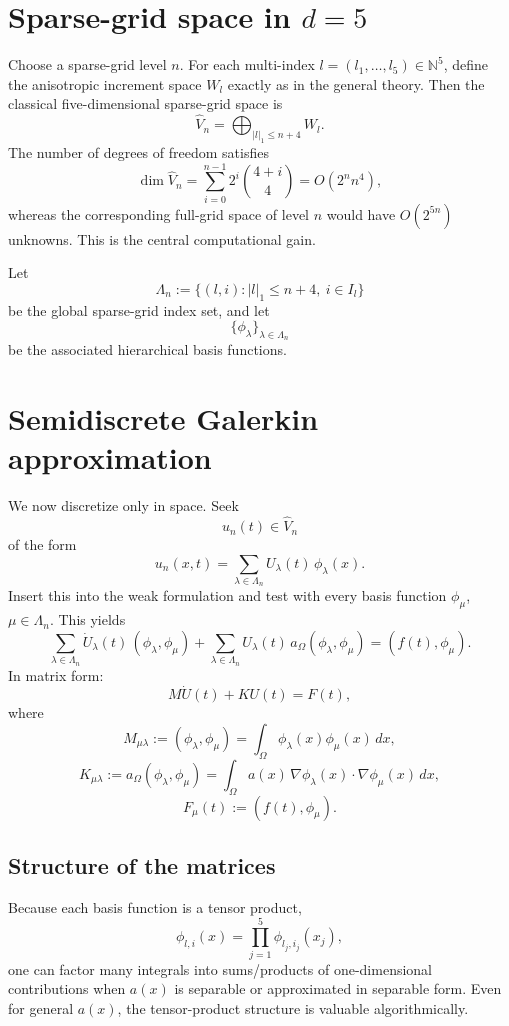 \documentclass[11pt,a4paper]{report}
\begin{document}
\section{Sparse-grid space in $d=5$}

Choose a sparse-grid level $n$. For each multi-index $l=(l_1,\dots,l_5)\in\mathbb{N}^5$, define the anisotropic increment space $W_l$ exactly as in the general theory. Then the classical five-dimensional sparse-grid space is
$$
\widehat V_n
=
\bigoplus_{|l|_1\le n+4} W_l.
$$
The number of degrees of freedom satisfies
$$
\dim \widehat V_n
=
\sum_{i=0}^{n-1} 2^i \binom{4+i}{4}
=
O(2^n n^4),
$$
whereas the corresponding full-grid space of level $n$ would have $O(2^{5n})$ unknowns. This is the central computational gain.

Let
$$
\Lambda_n := \{(l,i): |l|_1\le n+4,\ i\in I_l\}
$$
be the global sparse-grid index set, and let
$$
\{\phi_\lambda\}_{\lambda\in\Lambda_n}
$$
be the associated hierarchical basis functions.

\section{Semidiscrete Galerkin approximation}

We now discretize only in space. Seek
$$
u_n(t)\in \widehat V_n
$$
of the form
$$
u_n(x,t)=\sum_{\lambda\in\Lambda_n} U_\lambda(t)\,\phi_\lambda(x).
$$
Insert this into the weak formulation and test with every basis function $\phi_\mu$, $\mu\in\Lambda_n$. This yields
$$
\sum_{\lambda\in\Lambda_n} \dot U_\lambda(t)\,(\phi_\lambda,\phi_\mu)
+
\sum_{\lambda\in\Lambda_n} U_\lambda(t)\,a_\Omega(\phi_\lambda,\phi_\mu)
=
(f(t),\phi_\mu).
$$
In matrix form:
\begin{equation}
M \dot U(t) + K U(t) = F(t),
\label{eq:semi}
\end{equation}
where
$$
M_{\mu\lambda} := (\phi_\lambda,\phi_\mu)
= \int_\Omega \phi_\lambda(x)\phi_\mu(x)\,dx,
$$
$$
K_{\mu\lambda} := a_\Omega(\phi_\lambda,\phi_\mu)
= \int_\Omega a(x)\,\nabla \phi_\lambda(x)\cdot \nabla \phi_\mu(x)\,dx,
$$
$$
F_\mu(t) := (f(t),\phi_\mu).
$$

\subsection{Structure of the matrices}

Because each basis function is a tensor product,
$$
\phi_{l,i}(x)=\prod_{j=1}^5 \phi_{l_j,i_j}(x_j),
$$
one can factor many integrals into sums/products of one-dimensional contributions when $a(x)$ is separable or approximated in separable form. Even for general $a(x)$, the tensor-product structure is valuable algorithmically.
\end{document}
